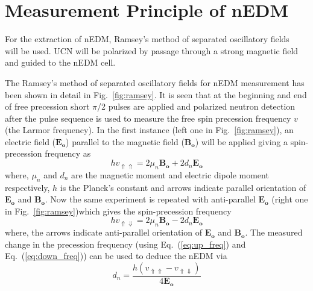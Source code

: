 \section{Measurement Principle of nEDM}\label{sec:nEDM}

For the extraction of nEDM, Ramsey's method of separated oscillatory fields~\cite{ramsey} will be used. UCN will be polarized by passage through a strong magnetic field and guided to the nEDM cell. 



The Ramsey's method of separated oscillatory fields for nEDM measurement has been shown in detail in Fig.~\ref{fig:ramsey}. It is seen that at the beginning and end of free precession short $\pi$/2 pulses are applied and polarized neutron detection after the pulse sequence is used to measure the free spin precession frequency $v$ (the Larmor frequency). In the first instance (left one in Fig.~\ref{fig:ramsey}), an electric field ($\bm{E_o}$) parallel to the magnetic field ($\bm{B_o}$) will be applied giving a spin-precession frequency as
\begin{equation}\label{eq:up_freq}
    h v_{\Uparrow \Uparrow}=2\mu_n\bm{B_o}+2 d_n\bm{E_o}
\end{equation}
where, $\mu_n$ and $d_n$ are the magnetic moment and electric dipole moment respectively, $h$ is the Planck's constant and arrows indicate parallel orientation of $\bm{E_o}$ and $\bm{B_o}$.
Now the same experiment is repeated with anti-parallel $\bm{E_o}$ (right one in Fig.~\ref{fig:ramsey})which gives the spin-precession frequency
\begin{equation}\label{eq:down_freq}
    h v_{\Uparrow \Downarrow}=2\mu_n\bm{B_o}-2 d_n\bm{E_o}
\end{equation}
where, the arrows indicate anti-parallel orientation of $\bm{E_o}$ and $\bm{B_o}$.
The measured change in the precession frequency (using Eq.~(\ref{eq:up_freq}) and Eq.~(\ref{eq:down_freq})) can be used to deduce the nEDM via
\begin{equation}\label{eq:nEDM}
    d_n=\frac{h (v_{\Uparrow \Uparrow}-v_{\Uparrow \Downarrow})}{4\bm{E_o}}
\end{equation}

